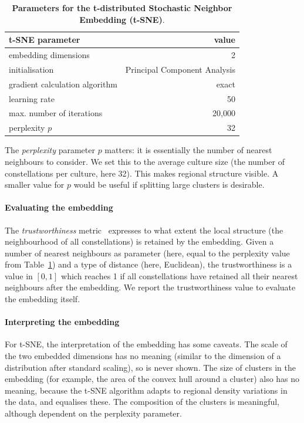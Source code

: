 \documentclass[10pt]{article}
\begin{document}
\begin{table}[htb]
\caption{\footnotesize {\bf Parameters for the t-distributed Stochastic Neighbor Embedding (t-SNE)}.}
\label{tab:tsne_parameters}
%
\centering
%
{\small
	\begin{tabular}{lr}
		{\bf t-SNE parameter}			&	{\bf value}	\\
		\hline
		embedding dimensions			&	2 		\\ 
		initialisation					&	Principal Component Analysis		\\
		gradient calculation algorithm	&	exact	\\
		learning rate					&	50 		\\
		max. number of iterations		&	20,000	\\ 
		perplexity $p$					&	32		\\
		\hline
	\end{tabular}
}
%
\end{table}

The \emph{perplexity} parameter $p$ matters: it is essentially the number of nearest neighbours to consider. We set this to the average culture size (the number of constellations per culture, here 32). This makes regional structure visible. A smaller value for $p$ would be useful if splitting large clusters is desirable.

\paragraph{Evaluating the embedding} The \emph{trustworthiness} metric~\cite{venna2001neighborhood,van2009learning} expresses to what extent the local structure (the neighbourhood of all constellations) is retained by the embedding. Given a number of nearest neighbours as parameter (here, equal to the perplexity value from Table~\ref{tab:tsne_parameters}) and a type of distance (here, Euclidean), the trustworthiness is a value in $[0,1]$ which reaches 1 if all constellations have retained all their nearest neighbours after the embedding. We report the trustworthiness value to evaluate the embedding itself. 

\paragraph{Interpreting the embedding} For t-SNE, the interpretation of the embedding has some caveats. The scale of the two embedded dimensions has no meaning (similar to the dimension of a distribution after standard scaling), so is never shown. The size of clusters in the embedding (for example, the area of the convex hull around a cluster) also has no meaning, because the t-SNE algorithm adapts to regional density variations in the data, and equalises these. The composition of the clusters is meaningful, although dependent on the perplexity parameter.
\end{document}
